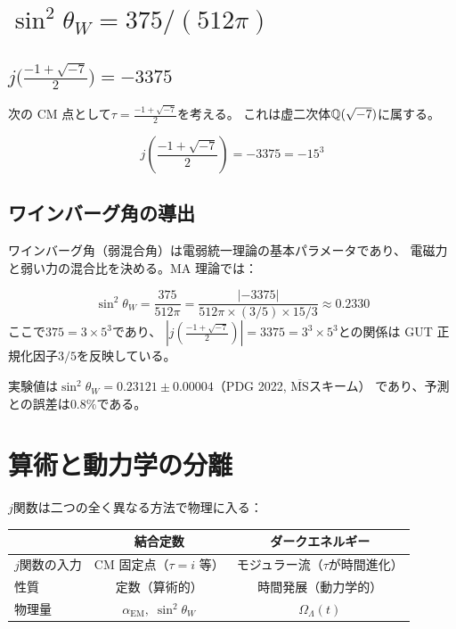 \section{$\sin^2\theta_W = 375/(512\pi)$}
\label{sec:Weinberg-angle}

\subsection{$j\!\bigl(\frac{-1+\sqrt{-7}}{2}\bigr) = -3375$}

次の CM 点として$\tau = \frac{-1+\sqrt{-7}}{2}$を考える。
これは虚二次体$\mathbb{Q}(\sqrt{-7})$に属する。

\begin{theorem}[$j$の値（$D=7$）]
\begin{equation}
j\!\left(\frac{-1+\sqrt{-7}}{2}\right) = -3375 = -15^3
\end{equation}
\end{theorem}

\subsection{ワインバーグ角の導出}

ワインバーグ角（弱混合角）は電弱統一理論の基本パラメータであり、
電磁力と弱い力の混合比を決める。MA 理論では：

\begin{keyresult}[ワインバーグ角]
\begin{equation}
\sin^2\theta_W = \frac{375}{512\pi}
= \frac{|{-3375}|}{512\pi \times (3/5) \times 15/3}
\approx 0.2330
\end{equation}
ここで$375 = 3 \times 5^3$であり、
$|j(\frac{-1+\sqrt{-7}}{2})| = 3375 = 3^3 \times 5^3$との関係は
GUT 正規化因子$3/5$を反映している。
\end{keyresult}

実験値は$\sin^2\theta_W = 0.23121 \pm 0.00004$（PDG 2022, $\overline{\text{MS}}$スキーム）
であり、予測との誤差は$0.8\%$である。

\section{算術と動力学の分離}
\label{sec:arithmetic-vs-dynamics}

$j$関数は二つの全く異なる方法で物理に入る：

\begin{center}
\renewcommand{\arraystretch}{1.3}
\begin{tabular}{lcc}
\toprule
& \textbf{結合定数} & \textbf{ダークエネルギー} \\
\midrule
$j$関数の入力 & CM 固定点（$\tau = i$ 等） & モジュラー流（$\tau$が時間進化） \\
性質 & 定数（算術的） & 時間発展（動力学的） \\
物理量 & $\alpha_{\mathrm{EM}},\;\sin^2\theta_W$ & $\Omega_\Lambda(t)$ \\
\bottomrule
\end{tabular}
\end{center}

